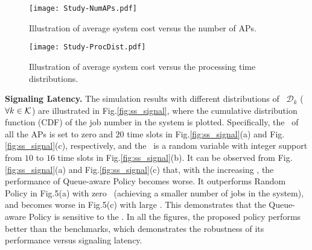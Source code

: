 \begin{figure}[hbt]                                                 %
    \centering                                                      %
    \texttt{[image: Study-NumAPs.pdf]}        %
    \caption{ Illustration of average system cost versus the number of APs.}
    \label{fig:ss_scale}                                            %
\end{figure}                                                        %

\begin{figure}[hbt]                                                 %
    \centering                                                      %
    \texttt{[image: Study-ProcDist.pdf]}      %
    \caption{ Illustration of average system cost versus the processing time distributions.}
    \label{fig:ss_dist}                                             %
\end{figure}                                                        %


\textbf{Signaling Latency.}
The simulation results with different distributions of \brlatency~$\mathcal{D}_{k}$ ($\forall k\in\mathcal{K}$) are illustrated in Fig.\ref{fig:ss_signal}, where the cumulative distribution function (CDF) of the job number in the system is plotted.
Specifically, the \brlatency~of all the APs is set to zero and $20$ time slots in Fig.\ref{fig:ss_signal}(a) and Fig.\ref{fig:ss_signal}(c), respectively, and the \brlatency~is a random variable with integer support from $10$ to $16$ time slots in Fig.\ref{fig:ss_signal}(b).
It can be observed from Fig.\ref{fig:ss_signal}(a) and Fig.\ref{fig:ss_signal}(c) that, with the increasing \brlatency, the performance of Queue-aware Policy becomes worse.
It outperforms Random Policy in Fig.5(a) with zero \brlatency~(achieving a smaller number of jobs in the system), and becomes worse in Fig.5(c) with large \brlatency.
This demonstrates that the Queue-aware Policy is sensitive to the \brlatency.
In all the figures, the proposed policy performs better than the benchmarks, which demonstrates the robustness of its performance versus signaling latency.

